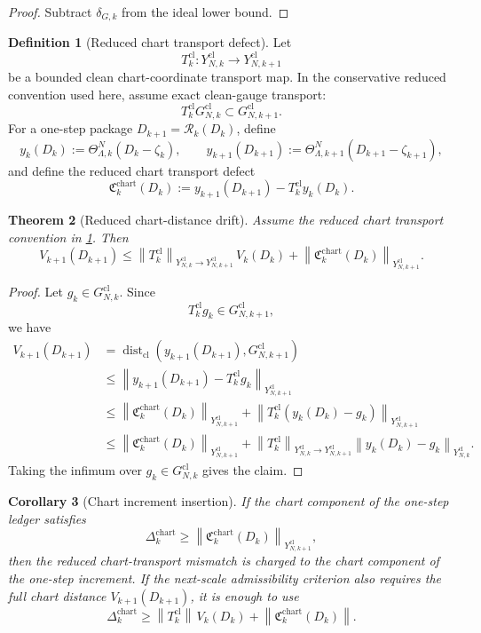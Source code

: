 \documentclass[11pt]{article}
\numberwithin{equation}{section}
\theoremstyle{plain}
\newtheorem{theorem}{Theorem}[section]
\newtheorem{corollary}[theorem]{Corollary}
\theoremstyle{definition}
\newtheorem{definition}[theorem]{Definition}
\theoremstyle{remark}
\newcommand{\cl}{\mathrm{cl}}
\newcommand{\Dist}{\operatorname{dist}}
\newcommand{\norm}[1]{\left\lVert #1\right\rVert}
\begin{document}
\begin{proof}
Subtract \(\delta_{G,k}\) from the ideal lower bound.
\end{proof}

\begin{definition}[Reduced chart transport defect]\label{def:chart-transport}
Let
\[
  T_k^{\cl}:Y_{N,k}^{\cl}\to Y_{N,k+1}^{\cl}
\]
be a bounded clean chart-coordinate transport map.  In the conservative
reduced convention used here, assume exact clean-gauge transport:
\[
  T_k^{\cl}G_{N,k}^{\cl}\subset G_{N,k+1}^{\cl}.
\]
For a one-step package \(D_{k+1}=\mathcal R_k(D_k)\), define
\[
  y_k(D_k):=\Theta_{\Lambda,k}^{N}(D_k-\zeta_k),
  \qquad
  y_{k+1}(D_{k+1})
  :=\Theta_{\Lambda,k+1}^{N}(D_{k+1}-\zeta_{k+1}),
\]
and define the reduced chart transport defect
\[
  \mathfrak C_k^{\mathrm{chart}}(D_k)
  :=
  y_{k+1}(D_{k+1})-T_k^{\cl}y_k(D_k).
\]
\end{definition}

\begin{theorem}[Reduced chart-distance drift]\label{thm:chart-drift}
Assume the reduced chart transport convention in
\cref{def:chart-transport}.  Then
\[
  V_{k+1}(D_{k+1})
  \le
  \norm{T_k^{\cl}}_{Y_{N,k}^{\cl}\to Y_{N,k+1}^{\cl}}\,V_k(D_k)
  +
  \norm{\mathfrak C_k^{\mathrm{chart}}(D_k)}_{Y_{N,k+1}^{\cl}}.
\]
\end{theorem}

\begin{proof}
Let \(g_k\in G_{N,k}^{\cl}\).  Since
\[
  T_k^{\cl}g_k\in G_{N,k+1}^{\cl},
\]
we have
\begin{align*}
  V_{k+1}(D_{k+1})
  &=
  \Dist_{\cl}(y_{k+1}(D_{k+1}),G_{N,k+1}^{\cl})\\
  &\le
  \norm{y_{k+1}(D_{k+1})-T_k^{\cl}g_k}_{Y_{N,k+1}^{\cl}}\\
  &\le
  \norm{\mathfrak C_k^{\mathrm{chart}}(D_k)}_{Y_{N,k+1}^{\cl}}
  +
  \norm{T_k^{\cl}(y_k(D_k)-g_k)}_{Y_{N,k+1}^{\cl}}\\
  &\le
  \norm{\mathfrak C_k^{\mathrm{chart}}(D_k)}_{Y_{N,k+1}^{\cl}}
  +
  \norm{T_k^{\cl}}_{Y_{N,k}^{\cl}\to Y_{N,k+1}^{\cl}}
  \norm{y_k(D_k)-g_k}_{Y_{N,k}^{\cl}}.
\end{align*}
Taking the infimum over \(g_k\in G_{N,k}^{\cl}\) gives the claim.
\end{proof}

\begin{corollary}[Chart increment insertion]\label{cor:chart-drift-insertion}
If the chart component of the one-step ledger satisfies
\[
  \Delta_k^{\mathrm{chart}}
  \ge
  \norm{\mathfrak C_k^{\mathrm{chart}}(D_k)}_{Y_{N,k+1}^{\cl}},
\]
then the reduced chart-transport mismatch is charged to the chart component
of the one-step increment.  If the next-scale admissibility criterion also
requires the full chart distance \(V_{k+1}(D_{k+1})\), it is enough to use
\[
  \Delta_k^{\mathrm{chart}}
  \ge
  \norm{T_k^{\cl}}\,V_k(D_k)
  +
  \norm{\mathfrak C_k^{\mathrm{chart}}(D_k)}.
\]
\end{corollary}
\end{document}
